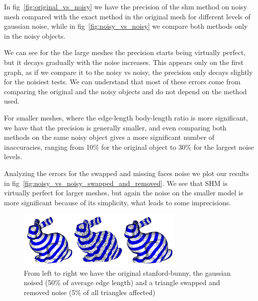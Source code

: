 \documentclass[sigconf]{acmart}
\begin{document}
In fig~\ref{fig:original_vs_noisy} we have the precision of the shm method on noisy mesh compared with the exact method in the original mesh for
different levels of gaussian noise, while in fig~\ref{fig:noisy_vs_noisy} we compare both methods only in the noisy objects.

We can see for the the large meshes the precision starts being virtually perfect, but it
decays gradually with the noise increases. This appears only on the first graph, as if we compare it to the noisy vs noisy, the precision
only decays slightly for the noisiest tests. We can understand that most of these errors come from comparing the original and the noisy objects
and do not depend on the method used.

For smaller meshes, where the edge-length body-length ratio is more significant, we have that the precision is generally smaller,
and even comparing both methods on the same noisy object gives a more significant number of inaccuracies, ranging from 10\% for the
original object to 30\% for the largest noise levels.

Analyzing the errors for the swapped and missing faces noise we plot our results
in fig~\ref{fig:noisy_vs_noisy_swapped_and_removed}. We see that SHM is virtually perfect
for larger meshes, but again the noise on the smaller model is more significant because
of its simplicity, what leads to some imprecisions. 

\begin{figure}
  \centering
  \includegraphics[width=8cm]{all_bunnies.png}
  \caption{From left to right we have the original stanford-bunny, the gaussian noised (50\% of average edge length) and a triangle swapped and removed noise (5\% of all triangles affected)}
  \label{fig:all_bunnies}
\end{figure}
\end{document}
